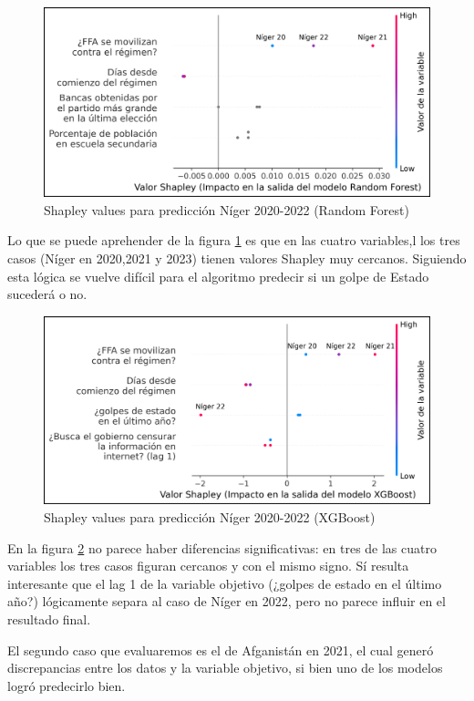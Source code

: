 \documentclass{article}
\begin{document}
\begin{figure}[H]
  \centering
  \includegraphics[width=.75\textwidth]{11_shapley_values_rf_niger.png}
  \caption{Shapley values para predicción Níger 2020-2022 (Random Forest)\label{fig:shapley_rf_niger}}
\end{figure}

Lo que se puede aprehender de la figura \ref{fig:shapley_rf_niger} es que en las cuatro variables,l
los tres casos (Níger en 2020,2021 y 2023) tienen valores Shapley muy cercanos. Siguiendo esta lógica
se vuelve difícil para el algoritmo predecir si un golpe de Estado sucederá o no.

\begin{figure}[H]
  \centering
  \includegraphics[width=.75\textwidth]{12_shapley_values_xgb_niger.png}
  \caption{Shapley values para predicción Níger 2020-2022 (XGBoost)\label{fig:shapley_xgb_niger}}
\end{figure}

En la figura \ref{fig:shapley_xgb_niger} no parece haber diferencias significativas: en tres de las
cuatro variables los tres casos figuran cercanos y con el mismo signo. Sí resulta interesante que el
lag 1 de la variable objetivo (¿golpes de estado en el último año?) lógicamente separa al caso de
Níger en 2022, pero no parece influir en el resultado final.

El segundo caso que evaluaremos es el de Afganistán en 2021, el cual generó discrepancias entre los
datos y la variable objetivo, si bien uno de los modelos logró predecirlo bien.
\end{document}
